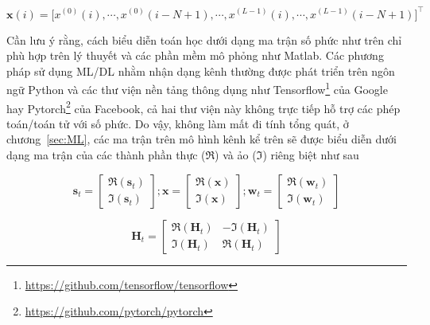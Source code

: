 \begin{equation}
        \mathbf{x}(i) = \big[x^{(0)}(i), \cdots, x^{(0)}(i-N+1), \cdots, 
        x^{(L-1)}(i), \cdots, x^{(L-1)}(i-N+1)\big]^\top
\end{equation} 

Cần lưu ý rằng, cách biểu diễn toán học dưới dạng ma trận số phức như trên chỉ phù hợp trên lý thuyết và các phần mềm mô phỏng như Matlab. Các phương pháp sử dụng ML/DL nhằm nhận dạng kênh thường được phát triển trên ngôn ngữ Python và các thư viện nền tảng thông dụng như Tensorflow\footnote{\url{https://github.com/tensorflow/tensorflow}} của Google hay Pytorch\footnote{\url{https://github.com/pytorch/pytorch}} của Facebook, cả hai thư viện này không trực tiếp hỗ trợ các phép toán/toán tử với số phức. Do vậy, không làm mất đi tính tổng quát, ở chương~\ref{sec:ML}, các ma trận trên mô hình kênh kể trên sẽ được biểu diễn dưới dạng ma trận của các thành phần thực ($\Re$) và ảo ($\Im$) riêng biệt như sau

\begin{equation}
    \mathbf{s}_t=\left[\begin{array}{l}
    \Re(\mathbf{s}_t) \\
    \Im(\mathbf{s}_t)
    \end{array}\right] ;
    \mathbf{x}=\left[\begin{array}{l}
    \Re(\mathbf{x}) \\
    \Im(\mathbf{x})
    \end{array}\right] ; 
    \mathbf{w}_t=\left[\begin{array}{l}
    \Re(\mathbf{w}_t) \\
    \Im(\mathbf{w}_t)
    \end{array}\right]
\end{equation}

\begin{equation}
    \mathbf{H}_t=\left[\begin{array}{cc}
    \Re(\mathbf{H}_t) & -\Im(\mathbf{H}_t) \\
    \Im(\mathbf{H}_t) & \Re(\mathbf{H}_t)
    \end{array}\right]
\end{equation}


